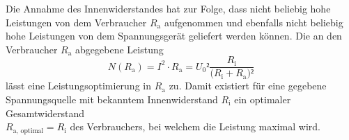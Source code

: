 Die Annahme des Innenwiderstandes hat zur Folge, dass nicht beliebig hohe Leistungen von dem Verbraucher $R_\text{a}$ aufgenommen und ebenfalls nicht beliebig hohe Leistungen von dem Spannungsgerät geliefert werden können. 
Die an den Verbraucher $R_\text{a}$ abgegebene Leistung 
\begin{equation}
N(R_\text{a}) = I^2\cdot R_\text{a}=U_0²\frac{R_\mathup{i}}{\bigl(R_\mathup{i}+R_\mathup{a}\bigr)²}
\label{eq:leistungsanpassung}
\end{equation}
 lässt eine Leistungsoptimierung in $R_\text{a}$ zu. 
Damit existiert für eine gegebene Spannungsquelle mit bekanntem Innenwiderstand $R_\text{i}$ ein optimaler Gesamtwiderstand \\$R_\text{a, optimal}=R_\mathup{i}$ des Verbrauchers,
bei welchem die Leistung maximal wird.
